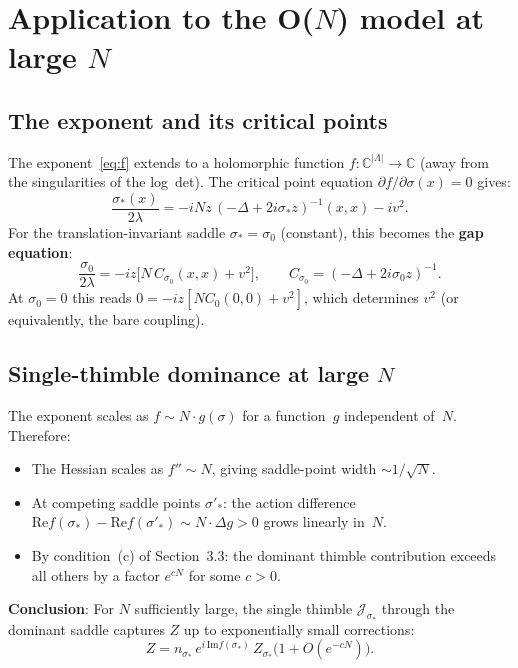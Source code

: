 \documentclass[12pt]{article}
\theoremstyle{definition}
\theoremstyle{remark}
\newcommand{\C}{\mathbb{C}}
\newcommand{\La}{\Lambda}
\newcommand{\im}{\mathrm{Im}}
\newcommand{\re}{\mathrm{Re}}
\begin{document}
\section{Application to the O($N$) model at large $N$}

\subsection{The exponent and its critical points}

The exponent~\eqref{eq:f} extends to a holomorphic function
$f : \C^{|\La|} \to \C$ (away from the singularities of the
log~det). The critical point equation $\partial f/\partial\sigma(x) = 0$
gives:
\begin{equation}\label{eq:gap}
  \frac{\sigma_*(x)}{2\lambda}
    = -iNz\,(-\Delta+2i\sigma_* z)^{-1}(x,x) - iv^2.
\end{equation}
For the translation-invariant saddle $\sigma_* = \sigma_0$
(constant), this becomes the \textbf{gap equation}:
\begin{equation}
  \frac{\sigma_0}{2\lambda} = -iz\bigl[N\,C_{\sigma_0}(x,x) + v^2\bigr],
  \qquad C_{\sigma_0} = (-\Delta+2i\sigma_0 z)^{-1}.
\end{equation}
At $\sigma_0 = 0$ this reads $0 = -iz[NC_0(0,0)+v^2]$, which
determines $v^2$ (or equivalently, the bare coupling).

\subsection{Single-thimble dominance at large $N$}

The exponent scales as $f \sim N\cdot g(\sigma)$ for a function~$g$
independent of~$N$. Therefore:
\begin{itemize}
\item The Hessian scales as $f'' \sim N$, giving saddle-point
  width $\sim 1/\sqrt{N}$.
\item At competing saddle points $\sigma'_*$: the action difference
  $\re f(\sigma_*) - \re f(\sigma'_*) \sim N\cdot\Delta g > 0$ grows
  linearly in~$N$.
\item By condition~(c) of Section~3.3: the dominant thimble
  contribution exceeds all others by a factor $e^{cN}$ for some $c > 0$.
\end{itemize}

\textbf{Conclusion}: For $N$ sufficiently large, the single thimble
$\mathcal{J}_{\sigma_*}$ through the dominant saddle captures $Z$
up to exponentially small corrections:
\begin{equation}
  Z = n_{\sigma_*}\,e^{i\,\im f(\sigma_*)}\,Z_{\sigma_*}
    \bigl(1 + O(e^{-cN})\bigr).
\end{equation}
\end{document}
